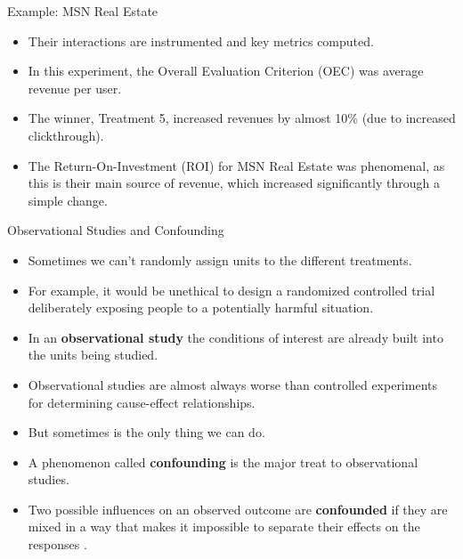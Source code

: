 \documentclass[handout]{beamer}
\begin{document}
\begin{frame}{Example: MSN Real Estate}
\scriptsize{


\begin{itemize}


 
 \item Their interactions are instrumented and key metrics computed. 
 
 \item In this experiment, the Overall Evaluation Criterion (OEC) was average revenue per user.
 \item The winner, Treatment 5, increased revenues by almost 10\% (due to increased clickthrough).
 
 \item The Return-On-Investment (ROI) for MSN Real Estate was phenomenal, as this is their main source of revenue, which increased significantly through a simple change.

\end{itemize}



} 
\end{frame}




\begin{frame}{Observational Studies and Confounding}
\scriptsize{

\begin{itemize}

 \item Sometimes we can't randomly assign units to the different treatments.
 
 \item For example, it would be unethical to design a randomized controlled trial deliberately exposing people to a potentially harmful situation. 
 
 \item In an \textbf{observational study} the conditions of interest are already built into the units being studied.
 
 \item Observational studies are almost always worse than controlled experiments for determining cause-effect relationships.
 
 \item But sometimes is the only thing we can do.
 
 \item A phenomenon called \textbf{confounding} is the major treat to observational studies.
 
 \item Two possible influences on an observed outcome are \textbf{confounded} if they are mixed in a way that makes it impossible to separate their effects on the responses \cite{watkins2010statistics}.
  
\end{itemize}



} 
\end{frame}
\end{document}
